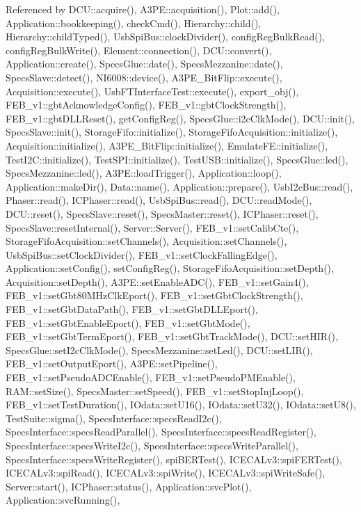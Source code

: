 Referenced by D\+C\+U\+::acquire(), A3\+P\+E\+::acquisition(), Plot\+::add(), Application\+::bookkeeping(), check\+Cmd(), Hierarchy\+::child(), Hierarchy\+::child\+Typed(), Usb\+Spi\+Bus\+::clock\+Divider(), config\+Reg\+Bulk\+Read(), config\+Reg\+Bulk\+Write(), Element\+::connection(), D\+C\+U\+::convert(), Application\+::create(), Specs\+Glue\+::date(), Specs\+Mezzanine\+::date(), Specs\+Slave\+::detect(), N\+I6008\+::device(), A3\+P\+E\+\_\+\+Bit\+Flip\+::execute(), Acquisition\+::execute(), Usb\+F\+T\+Interface\+Test\+::execute(), export\+\_\+obj(), F\+E\+B\+\_\+v1\+::gbt\+Acknowledge\+Config(), F\+E\+B\+\_\+v1\+::gbt\+Clock\+Strength(), F\+E\+B\+\_\+v1\+::gbt\+D\+L\+L\+Reset(), get\+Config\+Reg(), Specs\+Glue\+::i2c\+Clk\+Mode(), D\+C\+U\+::init(), Specs\+Slave\+::init(), Storage\+Fifo\+::initialize(), Storage\+Fifo\+Acquisition\+::initialize(), Acquisition\+::initialize(), A3\+P\+E\+\_\+\+Bit\+Flip\+::initialize(), Emulate\+F\+E\+::initialize(), Test\+I2\+C\+::initialize(), Test\+S\+P\+I\+::initialize(), Test\+U\+S\+B\+::initialize(), Specs\+Glue\+::led(), Specs\+Mezzanine\+::led(), A3\+P\+E\+::load\+Trigger(), Application\+::loop(), Application\+::make\+Dir(), Data\+::name(), Application\+::prepare(), Usb\+I2c\+Bus\+::read(), Phaser\+::read(), I\+C\+Phaser\+::read(), Usb\+Spi\+Bus\+::read(), D\+C\+U\+::read\+Mode(), D\+C\+U\+::reset(), Specs\+Slave\+::reset(), Specs\+Master\+::reset(), I\+C\+Phaser\+::reset(), Specs\+Slave\+::reset\+Internal(), Server\+::\+Server(), F\+E\+B\+\_\+v1\+::set\+Calib\+Cte(), Storage\+Fifo\+Acquisition\+::set\+Channels(), Acquisition\+::set\+Channels(), Usb\+Spi\+Bus\+::set\+Clock\+Divider(), F\+E\+B\+\_\+v1\+::set\+Clock\+Falling\+Edge(), Application\+::set\+Config(), set\+Config\+Reg(), Storage\+Fifo\+Acquisition\+::set\+Depth(), Acquisition\+::set\+Depth(), A3\+P\+E\+::set\+Enable\+A\+D\+C(), F\+E\+B\+\_\+v1\+::set\+Gain4(), F\+E\+B\+\_\+v1\+::set\+Gbt80\+M\+Hz\+Clk\+Eport(), F\+E\+B\+\_\+v1\+::set\+Gbt\+Clock\+Strength(), F\+E\+B\+\_\+v1\+::set\+Gbt\+Data\+Path(), F\+E\+B\+\_\+v1\+::set\+Gbt\+D\+L\+L\+Eport(), F\+E\+B\+\_\+v1\+::set\+Gbt\+Enable\+Eport(), F\+E\+B\+\_\+v1\+::set\+Gbt\+Mode(), F\+E\+B\+\_\+v1\+::set\+Gbt\+Term\+Eport(), F\+E\+B\+\_\+v1\+::set\+Gbt\+Track\+Mode(), D\+C\+U\+::set\+H\+I\+R(), Specs\+Glue\+::set\+I2c\+Clk\+Mode(), Specs\+Mezzanine\+::set\+Led(), D\+C\+U\+::set\+L\+I\+R(), F\+E\+B\+\_\+v1\+::set\+Output\+Eport(), A3\+P\+E\+::set\+Pipeline(), F\+E\+B\+\_\+v1\+::set\+Pseudo\+A\+D\+C\+Enable(), F\+E\+B\+\_\+v1\+::set\+Pseudo\+P\+M\+Enable(), R\+A\+M\+::set\+Size(), Specs\+Master\+::set\+Speed(), F\+E\+B\+\_\+v1\+::set\+Stop\+Inj\+Loop(), F\+E\+B\+\_\+v1\+::set\+Test\+Duration(), I\+Odata\+::set\+U16(), I\+Odata\+::set\+U32(), I\+Odata\+::set\+U8(), Test\+Suite\+::sigma(), Specs\+Interface\+::specs\+Read\+I2c(), Specs\+Interface\+::specs\+Read\+Parallel(), Specs\+Interface\+::specs\+Read\+Register(), Specs\+Interface\+::specs\+Write\+I2c(), Specs\+Interface\+::specs\+Write\+Parallel(), Specs\+Interface\+::specs\+Write\+Register(), spi\+B\+E\+R\+Test(), I\+C\+E\+C\+A\+Lv3\+::spi\+F\+E\+R\+Test(), I\+C\+E\+C\+A\+Lv3\+::spi\+Read(), I\+C\+E\+C\+A\+Lv3\+::spi\+Write(), I\+C\+E\+C\+A\+Lv3\+::spi\+Write\+Safe(), Server\+::start(), I\+C\+Phaser\+::status(), Application\+::svc\+Plot(), Application\+::svc\+Running(), 